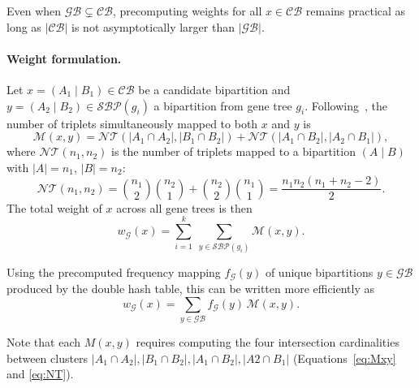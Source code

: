 \documentclass[10pt,a4paper]{article}
\begin{document}
Even when $\mathcal{GB} \subsetneq \mathcal{CB}$, precomputing weights for all $x \in \mathcal{CB}$ remains practical as long as $|\mathcal{CB}|$ is not asymptotically larger than $|\mathcal{GB}|$.



\paragraph{Weight formulation.}
Let $x = (A_1 \mid B_1) \in \mathcal{CB}$ be a candidate bipartition and $y = (A_2 \mid B_2) \in \mathcal{SBP}(g_i)$ a bipartition from gene tree $g_i$.  
Following~\cite{stelar}, the number of triplets simultaneously mapped to both $x$ and $y$ is
\begin{equation}
\mathcal{M}(x,y) = 
\mathcal{NT}(|A_1 \cap A_2|, |B_1 \cap B_2|) +
\mathcal{NT}(|A_1 \cap B_2|, |A_2 \cap B_1|),
\label{eq:Mxy}
\end{equation}
where $\mathcal{NT}(n_1,n_2)$ is the number of triplets mapped to a bipartition $(A \mid B)$ with $|A| = n_1$, $|B| = n_2$:
\begin{equation}
\mathcal{NT}(n_1,n_2) = 
\binom{n_1}{2}\binom{n_2}{1} + 
\binom{n_2}{2}\binom{n_1}{1}
= \frac{n_1 n_2 (n_1 + n_2 - 2)}{2}.
\label{eq:NT}
\end{equation}
The total weight of $x$ across all gene trees is then
\begin{equation}
w_{\mathcal{G}}(x) = \sum_{i=1}^{k} \ \sum_{y \in \mathcal{SBP}(g_i)} \mathcal{M}(x,y).
\end{equation}

Using the precomputed frequency mapping $f_{\mathcal{G}}(y)$ of unique bipartitions $y \in \mathcal{GB}$ produced by the double hash table, this can be written more efficiently as
\begin{equation}
w_{\mathcal{G}}(x) = \sum_{y \in \mathcal{GB}} f_{\mathcal{G}}(y) \, \mathcal{M}(x,y).
\label{eq:effcal}
\end{equation}

Note that each $M(x,y)$ requires computing the four intersection cardinalities  between clusters $|A_1\cap A_2|,|B_1\cap B_2|,|A_1\cap B_2|,|A2\cap B_1|$ (Equations~\eqref{eq:Mxy} and \eqref{eq:NT}).
\end{document}
